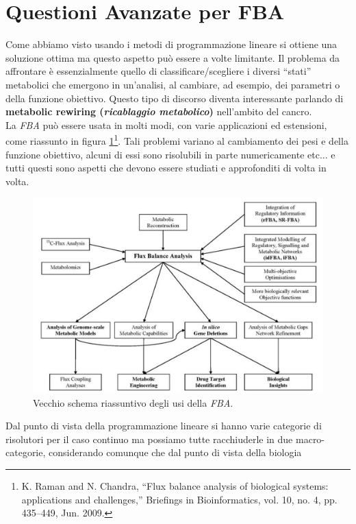 \documentclass[a4paper,12pt, oneside]{book}
\begin{document}
\section{Questioni Avanzate per FBA}
Come abbiamo visto usando i metodi di programmazione lineare si ottiene una
soluzione ottima ma questo aspetto può essere a volte limitante. Il problema da
affrontare è essenzialmente quello di classificare/scegliere i diversi ``stati''
metabolici che emergono in un'analisi, al cambiare, ad esempio, dei parametri o
della funzione obiettivo. Questo tipo di discorso diventa interessante parlando
di \textbf{metabolic rewiring (\textit{ricablaggio metabolico})} nell'ambito del
cancro. \\
La \textit{FBA} può essere usata in molti modi, con varie applicazioni ed
estensioni, come riassunto in figura \ref{fig:fba}\footnote{K. Raman and
  N. Chandra, “Flux balance analysis of 
  biological systems: applications and challenges,” Briefings in
  Bioinformatics, vol. 10, no. 4, pp. 435–449, Jun. 2009.}. Tali problemi
variano al cambiamento dei pesi e della funzione obiettivo, alcuni di essi sono
risolubili in parte numericamente etc$\ldots$ e tutti questi sono aspetti che
devono essere studiati e approfonditi di volta in volta.\\
\begin{figure}
  \centering
  \includegraphics[scale = 0.2]{img/fba.jpg}
  \caption{Vecchio schema riassuntivo degli usi della \textit{FBA}.}
  \label{fig:fba}
\end{figure}
Dal punto di vista della programmazione lineare si hanno varie categorie di
risolutori per il caso continuo ma possiamo tutte racchiuderle in due
macro-categorie, considerando comunque che dal punto di vista della biologia
\end{document}
